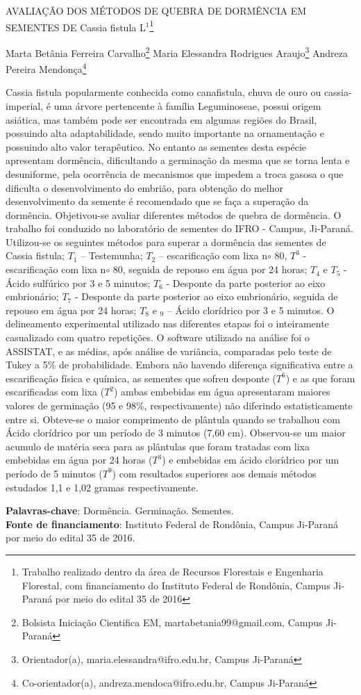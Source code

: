 \documentclass[article,12pt,onesidea,4paper,english,brazil]{abntex2}
\begin{document}
	
	
	\frenchspacing 
	
	\begin{center}
		\LARGE AVALIAÇÃO DOS MÉTODOS DE QUEBRA DE DORMÊNCIA EM SEMENTES DE Cassia fistula L$^1$\footnote{Trabalho realizado dentro da área de Recursos Florestais e Engenharia Florestal, com financiamento do Instituto Federal de Rondônia, Campus Ji-Paraná por meio do edital 35 de 2016}
		
		\normalsize
	Marta Betânia Ferreira Carvalho\footnote{Bolsista Iniciação Cientifica EM, martabetania99@gmail.com, Campus Ji-Paraná} 
		Maria Elessandra Rodrigues Araujo\footnote{Orientador(a), maria.elessandra@ifro.edu.br, Campus Ji-Paraná} 
		Andreza Pereira Mendonça\footnote{Co-orientador(a), andreza.mendoca@ifro.edu.br, Campus Ji-Paraná} 
	
	\end{center}
	
	\noindent 
	Cassia fistula popularmente conhecida como canafistula, chuva de ouro ou cassia-imperial, é uma árvore pertencente à família Leguminoseae, possui origem asiática, mas também pode ser encontrada em algumas regiões do Brasil, possuindo alta adaptabilidade, sendo muito importante na ornamentação e possuindo alto valor terapêutico. No entanto as sementes desta espécie apresentam dormência, dificultando a germinação da mesma que se torna lenta e desuniforme, pela ocorrência de mecanismos que impedem a troca gasosa o que dificulta o desenvolvimento do embrião, para obtenção do melhor desenvolvimento da semente é recomendado que se faça a superação da dormência. Objetivou-se avaliar diferentes métodos de quebra de dormência. O trabalho foi conduzido no laboratório de sementes do IFRO - Campus, Ji-Paraná. Utilizou-se os seguintes métodos para superar a dormência das sementes de Cassia fistula; $T_1$ – Testemunha; $T_2$ – escarificação com lixa n$\circ$ 80, $T^3$ - escarificação com lixa n$\circ$ 80, seguida de repouso em água por 24 horas; $T_4$ e $T_5$ - Ácido sulfúrico por 3 e 5 minutos; $T_6$ - Desponte da parte posterior ao eixo embrionário; $T_7$ - Desponte da parte posterior ao eixo embrionário, seguida de repouso em água por 24 horas; $T_8$ e $_9$ – Ácido clorídrico por 3 e 5 minutos. O delineamento experimental utilizado nas diferentes etapas foi o inteiramente casualizado com quatro repetições. O software utilizado na análise foi o ASSISTAT, e as médias, após análise de variância, comparadas pelo teste de Tukey a 5\% de probabilidade. Embora não havendo diferença significativa entre a escarificação física e química, as sementes que sofreu desponte ($T^6$) e as que foram escarificadas com lixa ($T^2$) ambas embebidas em água apresentaram maiores valores de germinação (95 e 98\%, respectivamente) não diferindo estatisticamente entre si. Obteve-se o maior comprimento de plântula quando se trabalhou com Ácido clorídrico por um período de 3 minutos (7,60 cm). Observou-se um maior acumulo de matéria seca para as plântulas que foram tratadas com lixa embebidas em água por 24 horas ($T^3$) e embebidas em ácido clorídrico por um período de 5 minutos ($T^9$) com resultados superiores aos demais métodos estudados 1,1 e 1,02 gramas respectivamente.
	
	\vspace{\onelineskip}
	
	\noindent
	\textbf{Palavras-chave}: Dormência. Germinação. Sementes. \\
	\textbf{Fonte de financiamento}: Instituto Federal de Rondônia, Campus Ji-Paraná por meio do edital 35 de 2016. 
	
\end{document}
